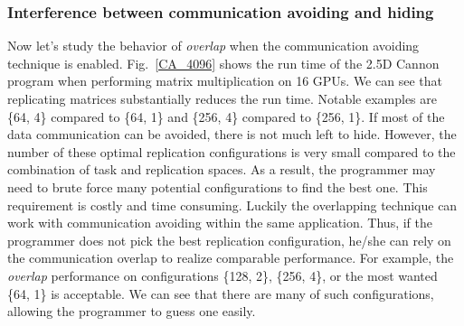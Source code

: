 \subsubsection{Interference between communication avoiding and hiding}
\label{subsec:CAvsOlap}
Now let's study the behavior of {\em overlap} when the communication avoiding technique is enabled.
Fig.~\ref{CA_4096} shows the run time of the 2.5D Cannon program when performing matrix multiplication on 16 GPUs.
We can see that replicating matrices substantially reduces the run time.
Notable examples are  \{64, 4\} compared to \{64, 1\} and \{256, 4\} compared to \{256, 1\}.
If most of the data communication can be avoided, there is not much left to hide.
However, the number of these optimal replication configurations is very small compared to the combination of task and replication spaces.
As a result, the programmer may need to brute force many potential configurations to find the best one.
This requirement is costly and time consuming.
Luckily the overlapping technique can work with communication avoiding within the same application.
Thus, if the programmer does not pick the best replication configuration, he/she can rely on the communication overlap to realize comparable performance.
For example, the {\em overlap} performance on configurations \{128, 2\}, \{256, 4\}, or the most wanted \{64, 1\} is  acceptable. 
We can see that there are many of such configurations, allowing the programmer to guess one easily.

